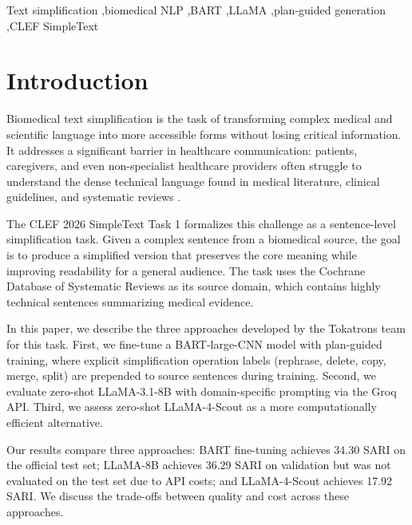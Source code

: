 \documentclass{ceurart}
\begin{document}
\begin{keywords}
Text simplification \sep biomedical NLP \sep BART \sep LLaMA \sep plan-guided generation \sep CLEF SimpleText
\end{keywords}

\maketitle

\section{Introduction}

Biomedical text simplification is the task of transforming complex medical and scientific language into more accessible forms without losing critical information.
It addresses a significant barrier in healthcare communication: patients, caregivers, and even non-specialist healthcare providers often struggle to understand the dense technical language found in medical literature, clinical guidelines, and systematic reviews \cite{simpletext-lncs}.

The CLEF 2026 SimpleText Task 1 \cite{bakker2026task1} formalizes this challenge as a sentence-level simplification task.
Given a complex sentence from a biomedical source, the goal is to produce a simplified version that preserves the core meaning while improving readability for a general audience.
The task uses the Cochrane Database of Systematic Reviews as its source domain, which contains highly technical sentences summarizing medical evidence.

In this paper, we describe the three approaches developed by the Tokatrons team for this task.
First, we fine-tune a BART-large-CNN model \cite{bart2020} with plan-guided training, where explicit simplification operation labels (rephrase, delete, copy, merge, split) are prepended to source sentences during training.
Second, we evaluate zero-shot LLaMA-3.1-8B \cite{llama3} with domain-specific prompting via the Groq API.
Third, we assess zero-shot LLaMA-4-Scout \cite{llama4} as a more computationally efficient alternative.

Our results compare three approaches: BART fine-tuning achieves 34.30 SARI on the official test set; LLaMA-8B achieves 36.29 SARI on validation but was not evaluated on the test set due to API costs; and LLaMA-4-Scout achieves 17.92 SARI.
We discuss the trade-offs between quality and cost across these approaches.
\end{document}
